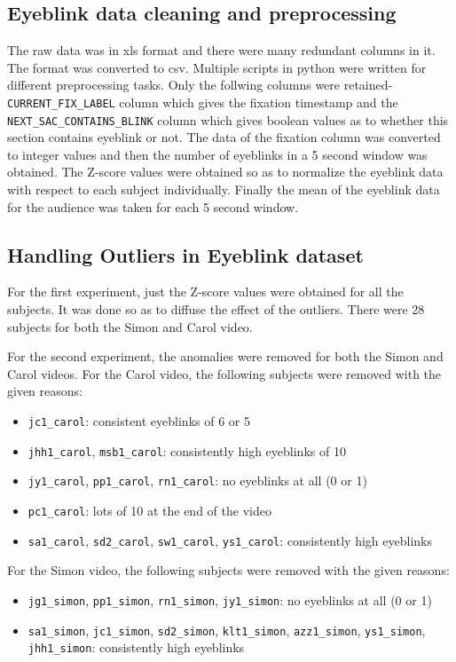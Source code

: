 \subsection{Eyeblink data cleaning and preprocessing}

The raw data was in xls format and there were many redundant columns in it. The format was converted to csv. Multiple scripts in python were written for different preprocessing tasks. Only the follwing columns were retained- \verb|CURRENT_FIX_LABEL| column which gives the fixation timestamp and the \verb|NEXT_SAC_CONTAINS_BLINK| column which gives boolean values as to whether this section contains eyeblink or not. The data of the fixation column was converted to integer values and then the number of eyeblinks in a 5 second window was obtained. The Z-score values were obtained so as to normalize the eyeblink data with respect to each subject individually. Finally the mean of the eyeblink data for the audience was taken for each 5 second window.

\subsection{Handling Outliers in Eyeblink dataset}

For the first experiment, just the Z-score values were obtained for all the subjects. It was done so as to diffuse the effect of the outliers. There were 28 subjects for both the Simon and Carol video.

For the second experiment, the anomalies were removed for both the Simon and Carol videos. For the Carol video, the following subjects were removed with the given reasons:
\begin{itemize}
\item \verb|jc1_carol|: consistent eyeblinks of 6 or 5
\item \verb|jhh1_carol|, \verb|msb1_carol|: consistently high eyeblinks of 10
\item \verb|jy1_carol|, \verb|pp1_carol|, \verb|rn1_carol|: no eyeblinks at all (0 or 1)
\item \verb|pc1_carol|: lots of 10 at the end of the video
\item \verb|sa1_carol|, \verb|sd2_carol|, \verb|sw1_carol|, \verb|ys1_carol|: consistently high eyeblinks
\end{itemize}
\clearpage
For the Simon video, the following subjects were removed with the given reasons:
\begin{itemize}
\item \verb|jg1_simon|, \verb|pp1_simon|, \verb|rn1_simon|, \verb|jy1_simon|: no eyeblinks at all (0 or 1)
\item \verb|sa1_simon|, \verb|jc1_simon|, \verb|sd2_simon|, \verb|klt1_simon|, \verb|azz1_simon|, \verb|ys1_simon|, \verb|jhh1_simon|: consistently high eyeblinks
\end{itemize}

